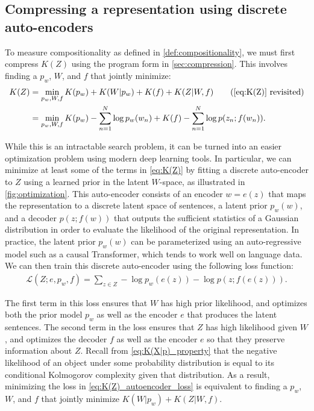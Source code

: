 \documentclass{article} %
\begin{document}
\begin{appendices}
\section{Compressing a representation using discrete auto-encoders}
\label{sec:optimization}

To measure compositionality as defined in \cref{def:compositionality}, we must first compress $K(Z)$ using the program form in \cref{sec:compression}. This involves finding a $p_w$, $W$, and $f$ that jointly minimize:
\begin{align}
    K(Z) &= \min_{p_w,W,f} K(p_w) + K(W|p_w) + K(f) + K(Z|W,f) \tag{\ref{eq:K(Z)} revisited} \\
         &= \min_{p_w,W,f} K(p_w) - \sum_{n=1}^N \log p_w(w_n) + K(f) - \sum_{n=1}^N \log p(z_n;f(w_n)) . \notag
\end{align}

While this is an intractable search problem, it can be turned into an easier optimization problem using modern deep learning tools. In particular, we can minimize at least some of the terms in \cref{eq:K(Z)} by fitting a discrete auto-encoder to $Z$ using a learned prior in the latent $W$-space, as illustrated in \cref{fig:optimization}. This auto-encoder consists of an encoder $w = e(z)$ that maps the representation to a discrete latent space of sentences, a latent prior $p_w(w)$, and a decoder $p(z ; f(w))$ that outputs the sufficient statistics of a Gaussian distribution in order to evaluate the likelihood of the original representation. In practice, the latent prior $p_w(w)$ can be parameterized using an auto-regressive model such as a causal Transformer, which tends to work well on language data. We can then train this discrete auto-encoder using the following loss function:
\begin{align}
    \label{eq:K(Z)_autoencoder_loss}
    \mathcal{L}(Z ; e, p_w, f) = \sum_{z \in Z} -\log p_w(e(z)) -\log p(z ; f(e(z))) .
\end{align}

The first term in this loss ensures that $W$ has high prior likelihood, and optimizes both the prior model $p_w$ as well as the encoder $e$ that produces the latent sentences. The second term in the loss ensures that $Z$ has high likelihood given $W$, and optimizes the decoder $f$ as well as the encoder $e$ so that they preserve information about $Z$. Recall from \cref{eq:K(X|p)_property} that the negative likelihood of an object under some probability distribution is equal to its conditional Kolmogorov complexity given that distribution. As a result, minimizing the loss in \cref{eq:K(Z)_autoencoder_loss} is equivalent to finding a $p_w$, $W$, and $f$ that jointly minimize $K(W|p_w) + K(Z|W,f)$.


\end{appendices}
\end{document}
